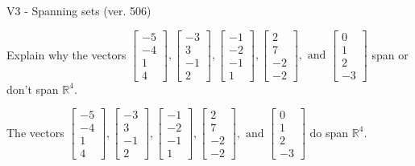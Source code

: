 \begin{exercise}
  \begin{exerciseTitle}V3 - Spanning sets (ver. 506)\end{exerciseTitle}
  \begin{exerciseStatement}
    Explain why the vectors \(\left[\begin{array}{r}
-5 \\
-4 \\
1 \\
4
\end{array}\right] , \left[\begin{array}{r}
-3 \\
3 \\
-1 \\
2
\end{array}\right] , \left[\begin{array}{r}
-1 \\
-2 \\
-1 \\
1
\end{array}\right] , \left[\begin{array}{r}
2 \\
7 \\
-2 \\
-2
\end{array}\right] , \text{ and } \left[\begin{array}{r}
0 \\
1 \\
2 \\
-3
\end{array}\right]\) span or don't span \(\mathbb{R}^4\). 
	


  \end{exerciseStatement}
  \begin{exerciseAnswer}
   The vectors \(\left[\begin{array}{r}
-5 \\
-4 \\
1 \\
4
\end{array}\right] , \left[\begin{array}{r}
-3 \\
3 \\
-1 \\
2
\end{array}\right] , \left[\begin{array}{r}
-1 \\
-2 \\
-1 \\
1
\end{array}\right] , \left[\begin{array}{r}
2 \\
7 \\
-2 \\
-2
\end{array}\right] , \text{ and } \left[\begin{array}{r}
0 \\
1 \\
2 \\
-3
\end{array}\right]\) 
  	 do  
	span \(\mathbb{R}^4\).
  



\end{exerciseAnswer}
\end{exercise}
